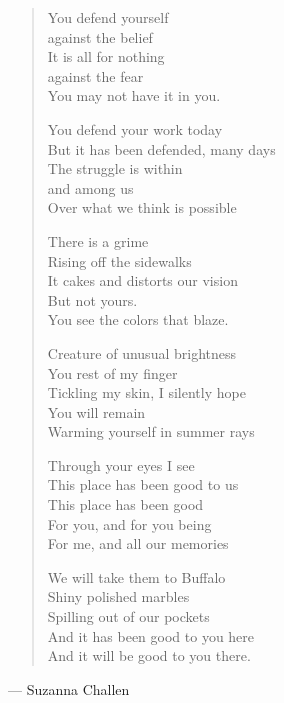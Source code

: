 {\ssp
\epigram
\begin{quote} 
You defend yourself\\
against the belief\\
It is all for nothing\\
against the fear\\
You may not have it in you.

\vspace*{0.1in}
You defend your work today\\
But it has been defended, many days\\
The struggle is within\\
and among us\\
Over what we think is possible

\vspace*{0.1in}

There is a grime\\
Rising off the sidewalks\\
It cakes and distorts our vision\\
But not yours.\\
You see the colors that blaze.

\vspace*{0.1in}

Creature of unusual brightness\\
You rest of my finger\\
Tickling my skin, I silently hope\\
You will remain\\
Warming yourself in summer rays

\vspace*{0.1in}
Through your eyes I see\\
This place has been good to us\\
This place has been good\\
For you, and for you being\\
For me, and all our memories

\vspace*{0.1in}
We will take them to Buffalo\\
Shiny polished marbles\\
Spilling out of our pockets\\
And it has been good to you here\\
And it will be good to you there.
\end{quote}
\hfill--- Suzanna Challen}
\newpage


